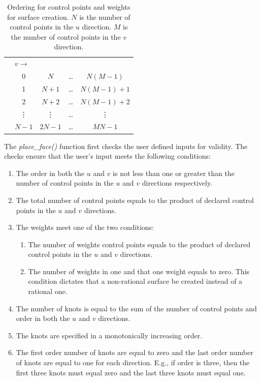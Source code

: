 \documentclass[a4paper, 12pt]{article}
\begin{document}
\begin{table}[H]
  \centering
  \begin{tabular}{l |c c c c |}
    \multicolumn{1}{c}{} & \multicolumn{4}{l}{ $v\longrightarrow$}\\
    \cline{2-5}
    \parbox[t]{2mm}{} 
    &0        & $N$     & \dots  & $N(M-1)$   \\
    &1        & $N+1$   & \dots  & $N(M-1)+1$ \\
    &2        & $N+2$   & \dots  & $N(M-1)+2$ \\
    &\vdots   & \vdots  & \dots  & \vdots     \\
    &$N-1$    & $2N-1$  & \dots  & $MN-1$     \\
  \end{tabular}
  \caption{Ordering for control points and weights for surface creation. $N$ is 
    the number of control points in the $u$ direction. $M$ is the number of
    control points in the $v$ direction.}
  \label{table:cpNum}
\end{table}

The \emph{place\_face()} function first checks the user defined inputs
for validity. The checks ensure that the user's input meets the 
following conditions:
\begin{enumerate}
  \item The order in both the $u$ and $v$ is not less than one or greater than
      the number of control points in the $u$ and $v$ directions respectively. 
  \item The total number of control points equals to the product of 
      declared control points in the $u$ and $v$ directions.
  \item The weights meet one of the two conditions:
  \begin{enumerate}
    \item The number of weights control points equals to the product of 
        declared control points in the $u$ and $v$ directions.
    \item The number of weights in one and that one weight equals to zero. 
        This condition dictates that a non-rational surface be created 
        instead of a rational one.
  \end{enumerate}
  \item The number of knots is equal to the sum of the number of control points
      and order in both the $u$ and $v$ directions.
  \item The knots are specified in a monotonically increasing order. 
  \item The first order number of knots are equal to zero and the last order number 
      of knots are equal to one for each direction. 
      E.g., if order is three, then the first three
      knots must equal zero and the last three knots must equal one.
\end{enumerate}
\end{document}
